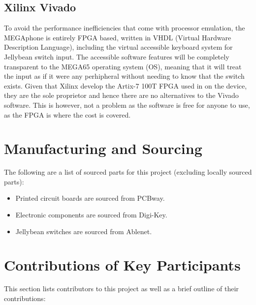 \subsection{Xilinx Vivado}

To avoid the performance inefficiencies that come with processor emulation, the MEGAphone is entirely FPGA based, written in VHDL (Virtual Hardware Description Language), including the virtual accessible keyboard system for Jellybean switch input.
The accessible software features will be completely transparent to the MEGA65 operating system (OS), meaning that it will treat the input as if it were any perhipheral without needing to know that the switch exists.
Given that Xilinx develop the Artix-7 100T FPGA used in on the device, they are the sole proprietor and hence there are no alternatives to the Vivado software.
This is however, not a problem as the software is free for anyone to use, as the FPGA is where the cost is covered.


\section{Manufacturing and Sourcing}

The following are a list of sourced parts for this project (excluding locally sourced parts):

\begin{itemize} 
    \item Printed circuit boards are sourced from PCBway. %
    \item Electronic components are sourced from Digi-Key.
    \item Jellybean switches are sourced from Ablenet.
    \end{itemize}

\section{Contributions of Key Participants} %

This section lists contributors to this project as well as a brief outline of their contributions:


